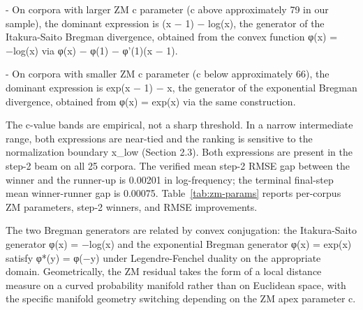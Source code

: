 \documentclass[11pt]{article}
\begin{document}
- On corpora with larger ZM c parameter (c above approximately 79 in our sample), the dominant expression is (x − 1) − log(x), the generator of the Itakura-Saito Bregman divergence, obtained from the convex function φ(x) = −log(x) via φ(x) − φ(1) − φ'(1)(x − 1).

- On corpora with smaller ZM c parameter (c below approximately 66), the dominant expression is exp(x − 1) − x, the generator of the exponential Bregman divergence, obtained from φ(x) = exp(x) via the same construction.

The c-value bands are empirical, not a sharp threshold. In a narrow intermediate range, both expressions are near-tied and the ranking is sensitive to the normalization boundary x\_low (Section 2.3). Both expressions are present in the step-2 beam on all 25 corpora. The verified mean step-2 RMSE gap between the winner and the runner-up is 0.00201 in log-frequency; the terminal final-step mean winner-runner gap is 0.00075. Table~\ref{tab:zm-params} reports per-corpus ZM parameters, step-2 winners, and RMSE improvements.

The two Bregman generators are related by convex conjugation: the Itakura-Saito generator φ(x) = −log(x) and the exponential Bregman generator φ(x) = exp(x) satisfy φ*(y) = φ(−y) under Legendre-Fenchel duality on the appropriate domain. Geometrically, the ZM residual takes the form of a local distance measure on a curved probability manifold rather than on Euclidean space, with the specific manifold geometry switching depending on the ZM apex parameter c.
\end{document}
